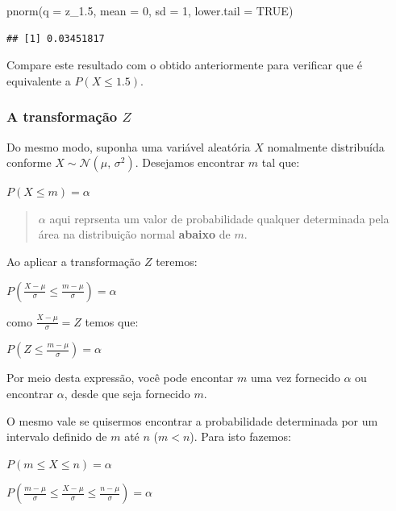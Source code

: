 \documentclass[
]{book}
\newenvironment{Shaded}{\begin{snugshade}}{\end{snugshade}}
\newcommand{\AttributeTok}[1]{\textcolor[rgb]{0.77,0.63,0.00}{#1}}
\newcommand{\ConstantTok}[1]{\textcolor[rgb]{0.00,0.00,0.00}{#1}}
\newcommand{\DecValTok}[1]{\textcolor[rgb]{0.00,0.00,0.81}{#1}}
\newcommand{\FloatTok}[1]{\textcolor[rgb]{0.00,0.00,0.81}{#1}}
\newcommand{\FunctionTok}[1]{\textcolor[rgb]{0.00,0.00,0.00}{#1}}
\newcommand{\NormalTok}[1]{#1}
\begin{document}
\begin{Shaded}
\begin{Highlighting}[]
\FunctionTok{pnorm}\NormalTok{(}\AttributeTok{q =}\NormalTok{ z\_1}\FloatTok{.5}\NormalTok{, }\AttributeTok{mean =} \DecValTok{0}\NormalTok{, }\AttributeTok{sd =} \DecValTok{1}\NormalTok{, }\AttributeTok{lower.tail =} \ConstantTok{TRUE}\NormalTok{)}
\end{Highlighting}
\end{Shaded}

\begin{verbatim}
## [1] 0.03451817
\end{verbatim}

Compare este resultado com o obtido anteriormente para verificar que é equivalente a \(P(X \le 1.5)\).

\hypertarget{a-transformauxe7uxe3o-z}{%
\subsubsection{\texorpdfstring{A transformação \(Z\)}{A transformação Z}}\label{a-transformauxe7uxe3o-z}}

Do mesmo modo, suponha uma variável aleatória \(X\) nomalmente distribuída conforme \(X \sim \mathcal{N}(\mu,\,\sigma^2)\). Desejamos encontrar \(m\) tal que:

\(P(X \le m) = \alpha\)

\begin{quote}
\(\alpha\) aqui reprsenta um valor de probabilidade qualquer determinada pela área na distribuição normal \textbf{abaixo} de \(m\).
\end{quote}

Ao aplicar a transformação \(Z\) teremos:

\(P(\frac{X - \mu}{\sigma} \le \frac{m - \mu}{\sigma}) = \alpha\)

como \(\frac{X - \mu}{\sigma} = Z\) temos que:

\(P(Z \le \frac{m - \mu}{\sigma}) = \alpha\)

Por meio desta expressão, você pode encontar \(m\) uma vez fornecido \(\alpha\) ou encontrar \(\alpha\), desde que seja fornecido \(m\).

O mesmo vale se quisermos encontrar a probabilidade determinada por um intervalo definido de \(m\) até \(n\) (\(m < n\)). Para isto fazemos:

\(P(m \le X \le n) = \alpha\)

\(P(\frac{m - \mu}{\sigma} \le \frac{X - \mu}{\sigma} \le \frac{n - \mu}{\sigma}) = \alpha\)
\end{document}
